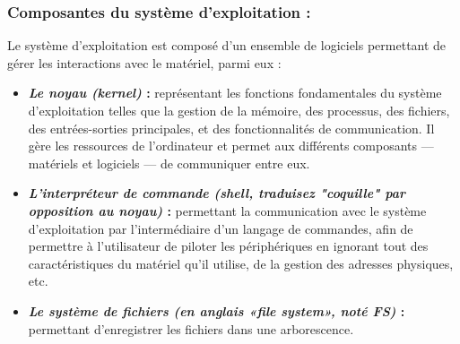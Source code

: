 		\subsubsection*{Composantes du système d'exploitation :}
			Le système d'exploitation est composé d'un ensemble de logiciels permettant de gérer les interactions avec le matériel, parmi eux :
			\begin{itemize}
				\item \textbf{\textit{Le noyau (kernel) }:} représentant les fonctions fondamentales du système d'exploitation telles que la gestion de la mémoire, des processus, des fichiers, des entrées-sorties principales, et des fonctionnalités de communication. Il gère les ressources de l’ordinateur et permet aux différents composants — matériels et logiciels — de communiquer entre eux.
				\item \textbf{\textit{L'interpréteur de commande (shell, traduisez "coquille" par opposition au noyau) }:} permettant la communication avec le système d'exploitation par l'intermédiaire d'un langage de commandes, afin de permettre à l'utilisateur de piloter les périphériques en ignorant tout des caractéristiques du matériel qu'il utilise, de la gestion des adresses physiques, etc.
				\item \textbf{\textit{Le système de fichiers (en anglais «file system», noté FS) }:} permettant d'enregistrer les fichiers dans une arborescence.
			\end{itemize}
		
